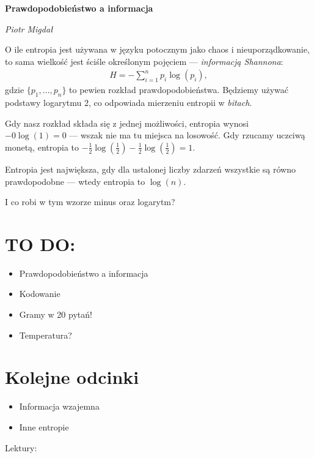 \documentclass[10pt,a4paper]{article}
\begin{document}
\noindent\textbf{\LARGE Prawdopodobieństwo a informacja}

\medskip
\noindent\textit{\Large Piotr Migdał} 

\medskip

O ile entropia jest używana w języku potocznym jako chaos i nieuporządkowanie, to sama wielkość jest ściśle określonym pojęciem --- \emph{informacją Shannona}:
%
\begin{align}
    H = -\sum_{i=1}^{n} p_i \log(p_i),
\end{align}
%
gdzie $\{p_1, \ldots, p_n\}$ to pewien rozkład prawdopodobieństwa. Będziemy używać podstawy logarytmu $2$, co odpowiada mierzeniu entropii w \emph{bitach}. 


Gdy nasz rozkład składa się z jednej możliwości, entropia wynosi $-0 \log(1) = 0$ --- wszak nie ma tu miejsca na losowość. Gdy rzucamy uczciwą monetą, entropia to $-\tfrac{1}{2} \log(\tfrac{1}{2}) -\tfrac{1}{2} \log(\tfrac{1}{2}) = 1$.


Entropia jest największa, gdy dla ustalonej liczby zdarzeń wszystkie są równo prawdopodobne --- wtedy entropia to $\log(n)$.

I co robi w tym wzorze minus oraz logarytm?


\section{TO DO:}

\begin{itemize}
    \item Prawdopodobieństwo a informacja
    \item Kodowanie
    \item Gramy w 20 pytań!
    \item Temperatura?
\end{itemize}

\section{Kolejne odcinki}

\begin{itemize}
    \item Informacja wzajemna
    \item Inne entropie
\end{itemize}




 Lektury:
\end{document}
